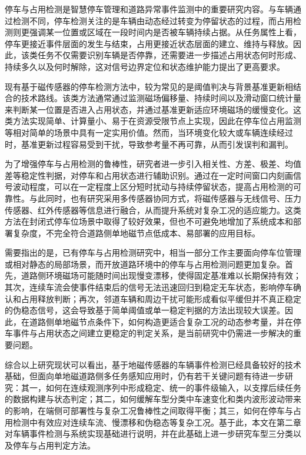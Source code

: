 停车与占用检测是智慧停车管理和道路异常事件监测中的重要研究内容。与车辆通过检测不同，停车检测关注的是车辆由动态经过转变为停留状态的过程，而占用检测则更强调某一位置或区域在一段时间内是否被车辆持续占据。从任务属性上看，停车更接近事件层面的发生与结束，占用更接近状态层面的建立、维持与释放。因此，该类任务不仅需要识别车辆是否停靠，还需要进一步描述占用状态何时形成、持续多久以及何时解除，这对信号边界定位和状态维护能力提出了更高要求。

现有基于磁传感器的停车检测方法中，较为常见的是阈值判决与背景基准更新相结合的技术路线。该类方法通常通过监测磁场偏移量、持续时间以及滑动窗口统计量来判断某一位置是否进入占用状态，并通过基准更新适应环境磁场的缓慢变化。这类方法实现简单、计算量小、易于在资源受限节点上实现，因此在停车位占用监测等相对简单的场景中具有一定实用价值。然而，当环境变化较大或车辆连续经过时，基准更新过程容易受到干扰，导致参考量不再可靠，从而引发误判和漏判。

为了增强停车与占用检测的鲁棒性，研究者进一步引入相关性、方差、极差、均值差等稳定性判据，对停车和占用状态进行辅助识别。通过在一定时间窗口内刻画信号波动程度，可以在一定程度上区分短时扰动与持续停留状态，提高占用检测的可靠性。与此同时，也有研究采用多传感器协同方式，将磁传感器与无线信号、压力传感器、红外传感器等信息进行融合，从而提升系统对复杂工况的适应能力。这类方法在封闭式停车位场景中取得了较好效果，但也不可避免地增加了系统成本和部署复杂度，不完全符合道路侧单地磁节点低成本、易部署的应用目标。

需要指出的是，已有停车与占用检测研究中，相当一部分工作主要面向停车位管理或相对静态的局部场景，而开放道路环境中的停车与占用检测问题更加复杂。首先，道路侧环境磁场可能随时间出现慢变漂移，使得固定基准难以长期保持有效；其次，连续车流会使事件结束后的信号无法迅速回归到稳定无车状态，影响停车确认和占用释放判断；再次，邻道车辆和周边干扰可能形成看似平缓但并不真正稳定的伪稳态信号，这会导致基于简单阈值或单一稳定判据的方法出现较大误差。因此，在道路侧单地磁节点条件下，如何构造更适合复杂工况的动态参考量，并在停车事件与占用状态之间建立更稳定的判定关系，是当前研究中仍需进一步解决的重要问题。

综合以上研究现状可以看出，基于地磁传感器的车辆事件检测已经具备较好的技术基础，但面向单地磁道路侧多任务感知应用时，仍有若干关键问题有待进一步研究：其一，如何在连续观测序列中形成稳定、统一的事件级输入，以支撑后续任务的数据构建与状态判定；其二，如何缓解车型分类中车速变化和类内波形波动带来的影响，在端侧可部署性与复杂工况鲁棒性之间取得平衡；其三，如何在停车与占用检测中有效应对连续车流、慢漂移和伪稳态等复杂工况。基于此，本文在第二章对车辆事件检测与系统实现基础进行说明，并在此基础上进一步研究车型三分类以及停车与占用判定方法。



